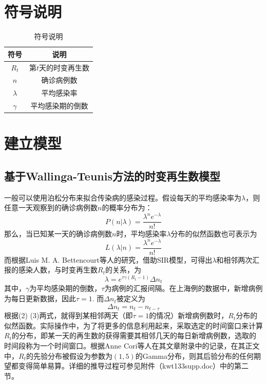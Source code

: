 \documentclass[a4paper,12pt,onecolumn,twoside]{article}
\begin{document}
\section{符号说明}
\begin{table}[H]
	\centering
	\setlength{\abovecaptionskip}{0pt}%
	\setlength{\belowcaptionskip}{5pt}%
	\setlength{\tabcolsep}{16mm}
	\caption{符号说明}\label{y}
	\begin{tabular}{cc}
		\toprule
		符号 & 说明                                        \\ \midrule
		$R_{t}$     & 第$t$天的时变再生数             \\
		$n$         & 确诊病例数             \\
		$\lambda$     	& 平均感染率           \\
		$\gamma$    &平均感染期的倒数 \\\midrule
	\end{tabular}
\end{table}

\section{建立模型}
\subsection{基于Wallinga-Teunis方法的时变再生数模型}
一般可以使用泊松分布来拟合传染病的感染过程。假设每天的平均感染率为$\lambda$，则任意一天观察到的确诊病例数$n$的概率分布为：
\begin{equation}
	P(n|\lambda)=\frac{\lambda^{n}e^{-\lambda}}{n!}
\end{equation}
那么，当已知某一天的确诊病例数$n$时，平均感染率$\lambda$分布的似然函数也可表示为
\begin{equation}
	L(\lambda|n)=\frac{\lambda^{n}e^{-\lambda}}{n!}
\end{equation}
而根据Luis M. A. Bettencourt等人的研究\cite{chowell2007comparative}，借助SIR模型，可得出$\lambda$和相邻两次汇报的感染人数，与时变再生数$R_{t}$的关系，为
\begin{equation}
	\lambda=e^{\tau\gamma(R_{t}-1)}\Delta n_{t}
\end{equation}
其中，$\gamma$为平均感染期的倒数，$\tau$为病例的汇报间隔。在上海例的数据中，新增病例为每日更新数据，因此$\tau=1.$ 而$\Delta n_{t}$被定义为
\begin{equation}
	\Delta n_{t}=n_{t}-n_{t-\tau}
\end{equation}
根据(2) (3)两式，就得到某相邻两天（即$\tau=1$的情况）新增病例数时，$R_{t}$分布的似然函数。实际操作中，为了将更多的信息利用起来，采取选定的时间窗口来计算$R_{t}$的分布，即某一天的再生数的获得需要其相邻几天的每日新增病例数，选取的时间段称为一个时间窗口。根据Anne Cori等人在其文章附录中的记录，在其正文中，$R_{t}$的先验分布被假设为参数为$(1,5)$的Gamma分布，则其后验分布的任何期望都变得简单易算。详细的推导过程可参见附件（kwt133supp.doc）中的第二节。
\end{document}
